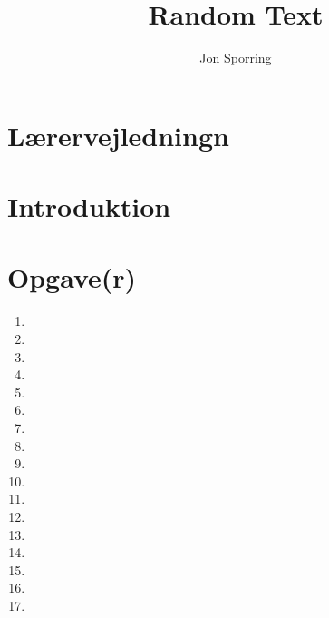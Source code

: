 \documentclass[a4paper,12pt]{article}
\title{Random Text}
\author{Jon Sporring}
\begin{document}
\maketitle

\section{Lærervejledningn}

\section{Introduktion}

\section{Opgave(r)}
\begin{enumerate}
\item 
\item 
\item 
\item 
\item 
\item 
\item 
\item 
\item 
\item 
\item 
\item 
 \item 
\item 
\item 
\item 
\item 
\end{enumerate}
\end{document}
